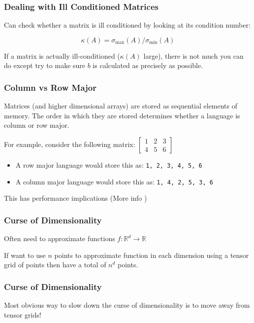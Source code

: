 \documentclass[10pt]{beamer}
\begin{document}
\begin{frame} \frametitle{Dealing with Ill Conditioned Matrices}
  Can check whether a matrix is ill conditioned by looking at its condition number:

  $$\kappa(A) = \sigma_{\text{max}}(A) / \sigma_{\text{min}}(A)$$

  If a matrix is actually ill-conditioned ($\kappa(A)$ large), there is not much you can do except try to make sure $b$ is calculated as precisely as possible.
\end{frame}

\begin{frame}[label=ColRowMajor] \frametitle{Column vs Row Major}

  Matrices (and higher dimensional arrays) are stored as sequential elements of memory. The order in which they are stored determines whether a language is column or row major.

  For example, consider the following matrix: $\begin{bmatrix} 1 & 2 & 3 \\ 4 & 5 & 6 \end{bmatrix}$
  \begin{itemize}
    \item A row major language would store this as: \lstinline{1, 2, 3, 4, 5, 6}
    \item A column major language would store this as: \lstinline{1, 4, 2, 5, 3, 6}
  \end{itemize}

  This has performance implications (More info \hyperlink{ColRowMajor_Supp}{})
\end{frame}

\begin{frame} \frametitle{Curse of Dimensionality}
  Often need to approximate functions $f: \mathbb{R}^d \rightarrow \mathbb{R}$

  If want to use $n$ points to approximate function in each dimension using a tensor grid of points then have a total of $n^d$ points.

  \begin{figure}
    \centering
    \scalebox{0.5}{}
  \end{figure}

\end{frame}

\begin{frame} \frametitle{Curse of Dimensionality}

  Most obvious way to slow down the curse of dimensionality is to move away from tensor grids!

  \begin{figure}
    \centering
    \scalebox{0.5}{}
  \end{figure}

\end{frame}
\end{document}
